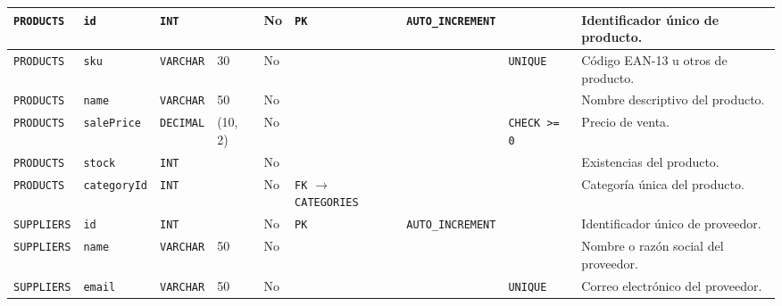 \documentclass[11pt]{article}
\begin{document}
\begin{landscape}
\begin{xltabular}{\textheight}{
    | p{3.1cm} 
    | p{2.0cm} 
    | p{1.5cm} 
    | p{1.4cm} 
    | p{0.9cm} 
    | p{3.0cm} 
    | p{3.0cm} 
    | p{2.0cm} 
    | p{3.5cm} |
}
    \texttt{PRODUCTS}           & \texttt{id}          & \texttt{INT}       &                      & No   & \texttt{PK}                                                    & \texttt{AUTO\_INCREMENT}    &               & Identificador único de producto. \\
    \midrule
    \texttt{PRODUCTS}           & \texttt{sku}         & \texttt{VARCHAR}   & 30                   & No   &                                                                &                             & \texttt{UNIQUE}        & Código EAN-13 u otros de producto. \\
    \midrule
    \texttt{PRODUCTS}           & \texttt{name}        & \texttt{VARCHAR}   & 50                   & No   &                                                                &                             &               & Nombre descriptivo del producto. \\
    \midrule
    \texttt{PRODUCTS}           & \texttt{salePrice}   & \texttt{DECIMAL}   & (10, 2)              & No   &                                                                &                             & \texttt{CHECK >= 0}    & Precio de venta. \\
    \midrule
    \texttt{PRODUCTS}           & \texttt{stock}       & \texttt{INT}       &                      & No   &                                                                &                             &               & Existencias del producto. \\
    \midrule
    \texttt{PRODUCTS}           & \texttt{categoryId}  & \texttt{INT}       &                      & No   & \texttt{FK} $\longrightarrow$ \texttt{CATEGORIES}                &                             &               & Categoría única del producto. \\
    \midrule
    \texttt{SUPPLIERS}          & \texttt{id}          & \texttt{INT}       &                      & No   & \texttt{PK}                                                    & \texttt{AUTO\_INCREMENT}    &               & Identificador único de proveedor. \\
    \midrule
    \texttt{SUPPLIERS}          & \texttt{name}        & \texttt{VARCHAR}   & 50                   & No   &                                                                &                             &               & Nombre o razón social del proveedor. \\
    \midrule
    \texttt{SUPPLIERS}          & \texttt{email}       & \texttt{VARCHAR}   & 50                   & No   &                                                                &                             & \texttt{UNIQUE}        & Correo electrónico del proveedor. \\

\end{xltabular}
\end{landscape}
\end{document}

